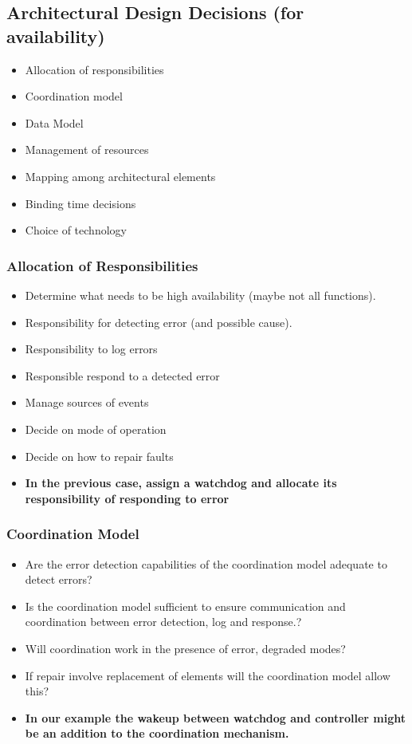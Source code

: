 \documentclass[a4paper]{article}
\begin{document}
\subsection{Architectural Design Decisions (for availability)}
\begin{itemize}
\item{Allocation of responsibilities}
\item{Coordination model}
\item{Data Model}
\item{Management of resources}
\item{Mapping among architectural elements}
\item{Binding time decisions}
\item{Choice of technology}
\end{itemize}

\subsubsection{Allocation of Responsibilities}

\begin{itemize}
\item{Determine what needs to be high availability (maybe not all functions).}
\item{Responsibility for detecting error (and possible cause).}
\item{Responsibility to log errors}
\item{Responsible respond to a detected error}
\item{Manage sources of events}
\item{Decide on mode of operation}
\item{Decide on how to repair faults}
\item \textbf{In the previous case, assign a watchdog and allocate its responsibility of responding to error}
\end{itemize}

\subsubsection{Coordination Model}
\begin{itemize}
\item{Are the error detection capabilities of the coordination model adequate to detect errors?}
\item{Is the coordination model sufficient to ensure communication and coordination between error detection, log and response.?}
\item{Will coordination work in the presence of error, degraded modes?}
\item{If repair involve replacement of elements will the coordination model allow this?}
\item \textbf{In our example the wakeup between watchdog and controller might be an addition to the coordination mechanism.}
\end{itemize}
\end{document}
